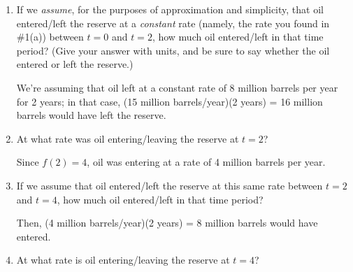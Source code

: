 \documentclass{article}
\begin{document}
\begin{enumerate}
\begin{enumerate}
    \begin{solution}
      Since $f(0) = - 8$, oil was leaving at a rate of 8 million barrels
      per year.
    \end{solution}

  \item
\begin{problem}[\vfill]
      If we \emph{assume}, for the purposes of approximation and simplicity, that oil
      entered/left the reserve at a \emph{constant} rate (namely, the rate
      you found in {{{{\#1}}(a)}}) between $t = 0$ and $t
      = 2$, how much oil entered/left in that time period?  (Give your
      answer with units, and be sure to say whether the oil entered or
      left the reserve.)
    \end{problem}

    \begin{solution} 
      We're assuming that oil left at a constant rate of $8$ million
      barrels per year for 2 years; in that case, (15 million
      barrels/year)(2 years) = 16 million barrels would have left the
      reserve.
    \end{solution}

  \item
    \begin{problem}[\vfill\newpage]
      At what rate was oil entering/leaving the reserve at $t = 2$?
    \end{problem}

    \begin{solution}
      Since $f(2) = 4$, oil was entering at a rate of 4 million barrels
      per year.
    \end{solution}

  \item
\begin{problem}[\vfill]
      If we assume that oil entered/left the reserve at this same rate
      between $t = 2$ and $t = 4$, how much oil entered/left in that time
      period?
    \end{problem}

    \begin{solution}
      Then, (4 million barrels/year)(2 years) = 8 million barrels
      would have entered.
    \end{solution}

  \item
    \begin{problem}[\stretch{0.5}]
      At what rate is oil entering/leaving the reserve at $t = 4$?      
    \end{problem}


\end{enumerate}
\end{enumerate}
\end{document}
